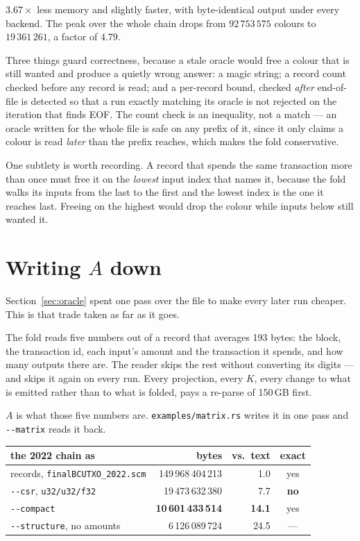 \documentclass[11pt,a4paper]{article}
\newcommand{\bin}[1]{\texttt{#1}}
\newcommand{\flag}[1]{\texttt{-{}-#1}}
\begin{document}
$3.67\times$ less memory and slightly faster, with byte-identical output under
every backend. The peak over the whole chain drops from $92\,753\,575$ colours
to $19\,361\,261$, a factor of $4.79$.

Three things guard correctness, because a stale oracle would free a colour that
is still wanted and produce a quietly wrong answer: a magic string; a record
count checked before any record is read; and a per-record bound, checked
\emph{after} end-of-file is detected so that a run exactly matching its oracle
is not rejected on the iteration that finds EOF. The count check is an
inequality, not a match --- an oracle written for the whole file is safe on any
prefix of it, since it only claims a colour is read \emph{later} than the prefix
reaches, which makes the fold conservative.

One subtlety is worth recording. A record that spends the same transaction more
than once must free it on the \emph{lowest} input index that names it, because
the fold walks its inputs from the last to the first and the lowest index is the
one it reaches last. Freeing on the highest would drop the colour while inputs
below still wanted it.

\section{Writing $A$ down}
\label{sec:matrix}

Section~\ref{sec:oracle} spent one pass over the file to make every later run
cheaper. This is that trade taken as far as it goes.

The fold reads five numbers out of a record that averages 193 bytes: the block,
the transaction id, each input's amount and the transaction it spends, and how
many outputs there are. The reader skips the rest without converting its digits
--- and skips it again on every run. Every projection, every $K$, every change to
what is emitted rather than to what is folded, pays a re-parse of 150\,GB first.

$A$ is what those five numbers are. \bin{examples/matrix.rs} writes it in one
pass and \flag{matrix} reads it back.

\begin{center}
\begin{tabular}{lrrc}
\toprule
the 2022 chain as & bytes & vs.\ text & exact \\
\midrule
records, \texttt{finalBCUTXO\_2022.scm}   & 149\,968\,404\,213 & 1.0 & yes \\
\flag{csr}, \texttt{u32/u32/f32}          & 19\,473\,632\,380  & 7.7 & \textbf{no} \\
\flag{compact}                            & \textbf{10\,601\,433\,514} & \textbf{14.1} & yes \\
\flag{structure}, no amounts              & 6\,126\,089\,724 & 24.5 & --- \\
\bottomrule
\end{tabular}
\end{center}
\end{document}
